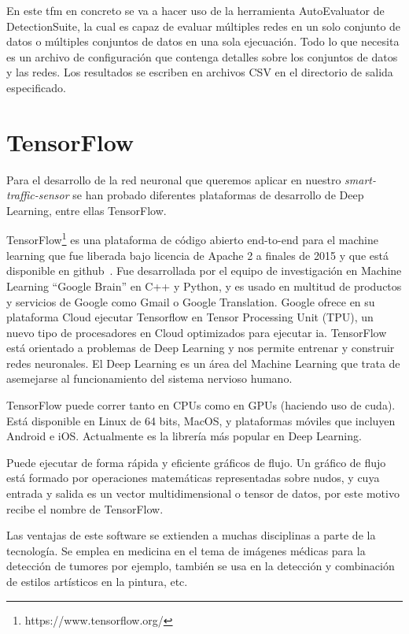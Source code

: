 En este \acrshort{tfm} en concreto se va a hacer uso de la herramienta AutoEvaluator de DetectionSuite, la cual es capaz de evaluar múltiples redes en un solo conjunto de datos o múltiples conjuntos de datos en una sola ejecuación. Todo lo que necesita es un archivo de configuración que contenga detalles sobre los conjuntos de datos y las redes. Los resultados se escriben en archivos CSV en el directorio de salida especificado.

\section{TensorFlow}
Para el desarrollo de la red neuronal que queremos aplicar en nuestro \textit{smart-traffic-sensor} se  han probado diferentes plataformas de desarrollo de Deep Learning, entre ellas TensorFlow.

TensorFlow\footnote{https://www.tensorflow.org/} es una plataforma de código abierto end-to-end para el machine learning que fue liberada bajo licencia de Apache 2 a finales de 2015 y que está disponible en github~\cite{github_tensorflow}. Fue desarrollada por el equipo de investigación en Machine Learning “Google Brain” en C++ y Python, y es usado en multitud de productos y servicios de Google como Gmail o Google Translation. Google ofrece en su plataforma Cloud ejecutar Tensorflow en Tensor Processing Unit (TPU), un nuevo tipo de procesadores en Cloud optimizados para ejecutar \acrfull{ia}. TensorFlow está orientado a problemas de Deep Learning y nos permite entrenar y construir redes neuronales. El Deep Learning es un área del Machine Learning que trata de asemejarse al funcionamiento del sistema nervioso humano.

TensorFlow puede correr tanto en CPUs como en GPUs (haciendo uso de \acrfull{cuda}). Está disponible en Linux de 64 bits, MacOS, y plataformas móviles que incluyen Android e iOS. Actualmente es la librería más popular en Deep Learning.

Puede ejecutar de forma rápida y eficiente gráficos de flujo. Un gráfico de flujo está formado por operaciones matemáticas representadas sobre nudos, y cuya entrada y salida es un vector multidimensional o tensor de datos, por este motivo recibe el nombre de TensorFlow.

Las ventajas de este software se extienden a muchas disciplinas a parte de la tecnología. Se emplea en medicina en el tema de imágenes médicas para la detección de tumores por ejemplo, también se usa en la detección y combinación de estilos artísticos en la pintura, etc.


